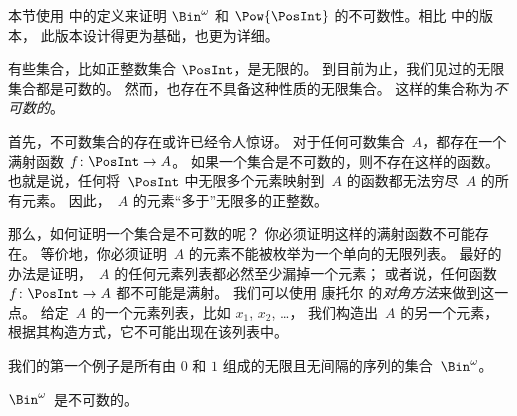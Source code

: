 \documentclass[../../../include/open-logic-section]{subfiles}
\begin{document}


\begin{editorial}
  本节使用  中的定义来证明 $\Bin^\omega$ 和
  $\Pow{\PosInt}$ 的不可数性。相比  中的版本，
  此版本设计得更为基础，也更为详细。
\end{editorial}

有些集合，比如正整数集合 $\PosInt$，是无限的。
到目前为止，我们见过的无限集合都是可数的。
然而，也存在不具备这种性质的无限集合。
这样的集合称为\emph{不可数的}。

首先，不可数集合的存在或许已经令人惊讶。
对于任何可数集合~$A$，都存在一个满射函数 $f \colon \PosInt \to A$。
如果一个集合是不可数的，则不存在这样的函数。
也就是说，任何将~$\PosInt$ 中无限多个元素映射到~$A$ 的函数都无法穷尽~$A$ 的所有元素。
因此，~$A$ 的元素“多于”无限多的正整数。

那么，如何证明一个集合是不可数的呢？
你必须证明这样的满射函数不可能存在。
等价地，你必须证明~$A$ 的元素不能被枚举为一个单向的无限列表。
最好的办法是证明，~$A$ 的任何元素列表都必然至少漏掉一个元素；
或者说，任何函数 $f\colon \PosInt \to A$ 都不可能是满射。
我们可以使用 康托尔 的\emph{对角方法}来做到这一点。
给定~$A$ 的一个元素列表，比如 $x_1$, $x_2$, \dots，
我们构造出~$A$ 的另一个元素，根据其构造方式，它不可能出现在该列表中。

我们的第一个例子是所有由 $0$ 和 $1$ 组成的无限且无间隔的序列的集合~$\Bin^\omega$。

\begin{thm}
$\Bin^\omega$~是不可数的。
\end{thm}
\end{document}
